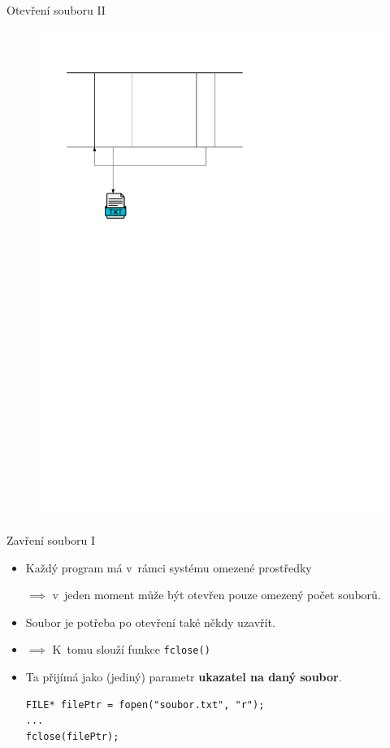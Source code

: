 \documentclass[14pt,aspectratio=169]{beamer}
\begin{document}
    \begin{frame}[t]{Otevření souboru \textrm{II}}
        \begin{figure}
            \centering
            \includegraphics[scale=.7]{images/file_pointer.pdf}
        \end{figure}
    \end{frame}

    \begin{frame}[t,fragile]{Zavření souboru \textrm{I}}
        \begin{itemize}
            \item Každý program má v~rámci systému omezené prostředky
            \begin{center}
                $\implies$ v~jeden moment může být otevřen pouze omezený počet souborů.
            \end{center}
            \item Soubor je potřeba po otevření také někdy uzavřít.
            \item $\implies$ K~tomu slouží funkce \texttt{fclose()}
            \item Ta přijímá jako (jediný) parametr \textbf{ukazatel na daný soubor}.
            \begin{lstlisting}
FILE* filePtr = fopen("soubor.txt", "r");
...
fclose(filePtr);
            \end{lstlisting}
        \end{itemize}
    \end{frame}
\end{document}
